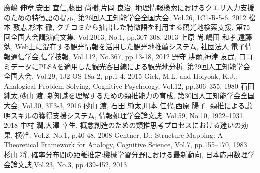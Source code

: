 \documentclass{deimj}
\begin{document}
\vspace{2em}
\begin{thebibliography}{99}
  廣嶋 伸章,安田 宜仁,藤田 尚樹,片岡 良治,
    地理情報検索におけるクエリ入力支援のための特徴語の提示,
    第26回人工知能学会全国大会, Vol.26, 1C1-R-5-6, 2012
  松本 敦志,杉本 徹,
    クチコミから抽出した特徴語を利用する観光地検索支援,
    第75回全国大会講演論文集, Vol.2013, No.1, pp.307-308, 2013
  上原 尚,嶋田 和孝,遠藤 勉,
    Web上に混在する観光情報を活用した観光地推薦システム,
    社団法人 電子情報通信学会,信学技報, Vol.112, No.367, pp.13-18, 2012
  野守 耕爾,神津 友武,
    口コミデータにPLSAを適用した観光客目線による観光地分析,
    第29回人工知能学会全国大会, Vol.29, 1J2-OS-18a-2, pp.1-4, 2015
  Gick, M.L. and Holyoak, K.J.:
  Analogical Problem Solving,
  Cognitive Psychology, Vol.12, pp.306–355, 1980
  石田 純太,砂山 渡,
    新知識を理解するための類推能力の育成,
    第30回人工知能学会全国大会, Vol.30, 3F3-3, 2016
  砂山 渡, 石田 純太,川本 佳代,西原 陽子,
    類推による説明スキルの獲得支援システム,
    情報処理学会論文誌, Vol.59, No.10, 1922–1931, 2018
  中村 潤,大澤 幸生,
    概念創造のための類推思考プロセスにおける迷いの効果,
    横幹, Vol.2, No.1, p.40-48, 2008
  Gentner, D.: Structure-Mapping:
  A Theoretical Framework for Analogy,
  Cognitive Science, Vol.7, pp.155–170, 1983
    杉山 将,
    確率分布間の距離推定:機械学習分野における最新動向,
    日本応用数理学会論文誌,Vol.23, No.3, pp.439-452, 2013
\end{thebibliography}
\end{document}
